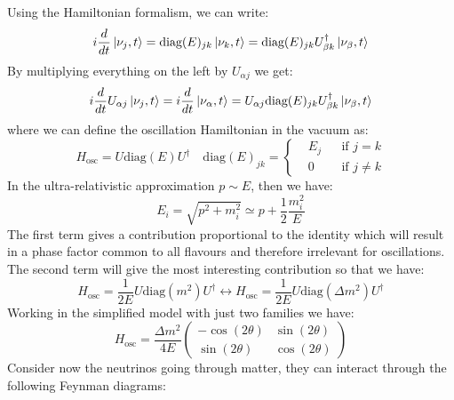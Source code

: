\documentclass[10.75pt,a4paper,openright,bottom=2cm]{article}
\begin{document}
Using the Hamiltonian formalism, we can write:
\[
i\frac{d}{dt}\ket{\nu_j,t}=\text{diag}(E)_{jk}\ket{\nu_k,t}=\text{diag}(E)_{jk}U^\dagger_{\beta k}\ket{\nu_\beta,t}
\]
By multiplying everything on the left by $U_{\alpha j}$ we get:
\[
i\frac{d}{dt}U_{\alpha j}\ket{\nu_j,t}=i\frac{d}{dt}\ket{\nu_\alpha,t}=U_{\alpha j}\text{diag}(E)_{jk}U^\dagger_{\beta k}\ket{\nu_\beta,t}
\]
where we can define the oscillation Hamiltonian in the vacuum as:
\[
H_{\text{osc}}=U\text{diag}(E)U^\dagger \quad \text{diag}(E)_{jk}=\left\{\begin{aligned}
&E_j &&\text{if $j=k$}\\
&0 &&\text{if $j\neq k$} 
\end{aligned}
\right.
\]
In the ultra-relativistic approximation $p\sim E$, then we have:
\[
E_i=\sqrt{p^2+m_i^2}\simeq p+\frac{1}{2}\frac{m_i^2}{E}
\]
The first term gives a contribution proportional to the identity which will result in a phase factor common to all flavours and therefore irrelevant for oscillations. The second term will give the most interesting contribution so that we have:
\[
H_{\text{osc}}=\frac{1}{2E}U\text{diag}(m^2)U^\dagger\longleftrightarrow H_{\text{osc}}=\frac{1}{2E}U\text{diag}(\Delta m^2)U^\dagger
\]
Working in the simplified model with just two families we have:
\[
H_{\text{osc}}=\frac{\Delta m^2}{4E}\left(\begin{array}{cc}
    -\cos(2\theta) & \sin(2\theta) \\
    \sin(2\theta) & \cos(2\theta)
\end{array}\right)
\]
Consider now the neutrinos going through matter, they can interact through the following Feynman diagrams:\\
\begin{minipage}{0.5\textwidth}
\begin{center}
\end{center}
\end{minipage}
\end{document}
